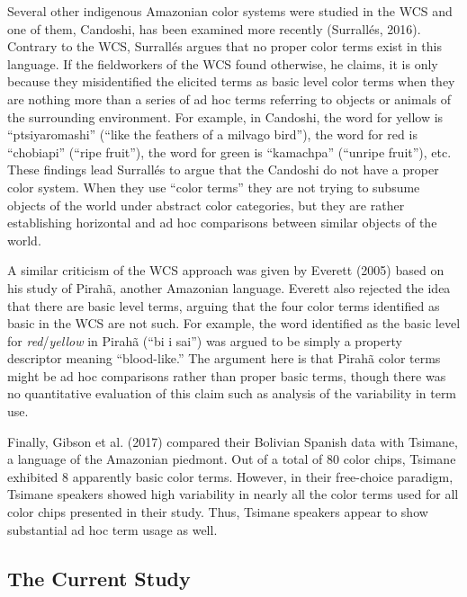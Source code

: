 \documentclass[
  english,
  ,apa7,floatsintext]{apa6}
\begin{document}
Several other indigenous Amazonian color systems were studied in the WCS and one of them, Candoshi, has been examined more recently (Surrallés, 2016). Contrary to the WCS, Surrallés argues that no proper color terms exist in this language. If the fieldworkers of the WCS found otherwise, he claims, it is only because they misidentified the elicited terms as basic level color terms when they are nothing more than a series of ad hoc terms referring to objects or animals of the surrounding environment. For example, in Candoshi, the word for yellow is ``ptsiyaromashi'' (``like the feathers of a milvago bird''), the word for red is ``chobiapi'' (``ripe fruit''), the word for green is ``kamachpa'' (``unripe fruit''), etc. These findings lead Surrallés to argue that the Candoshi do not have a proper color system. When they use ``color terms'' they are not trying to subsume objects of the world under abstract color categories, but they are rather establishing horizontal and ad hoc comparisons between similar objects of the world.

A similar criticism of the WCS approach was given by Everett (2005) based on his study of Pirahã, another Amazonian language. Everett also rejected the idea that there are basic level terms, arguing that the four color terms identified as basic in the WCS are not such. For example, the word identified as the basic level for \emph{red}/\emph{yellow} in Pirahã (``bi i sai'') was argued to be simply a property descriptor meaning ``blood-like.'' The argument here is that Pirahã color terms might be ad hoc comparisons rather than proper basic terms, though there was no quantitative evaluation of this claim such as analysis of the variability in term use.

Finally, Gibson et al. (2017) compared their Bolivian Spanish data with Tsimane, a language of the Amazonian piedmont. Out of a total of 80 color chips, Tsimane exhibited 8 apparently basic color terms. However, in their free-choice paradigm, Tsimane speakers showed high variability in nearly all the color terms used for all color chips presented in their study. Thus, Tsimane speakers appear to show substantial ad hoc term usage as well.

\hypertarget{the-current-study}{%
\subsection{The Current Study}\label{the-current-study}}
\end{document}

